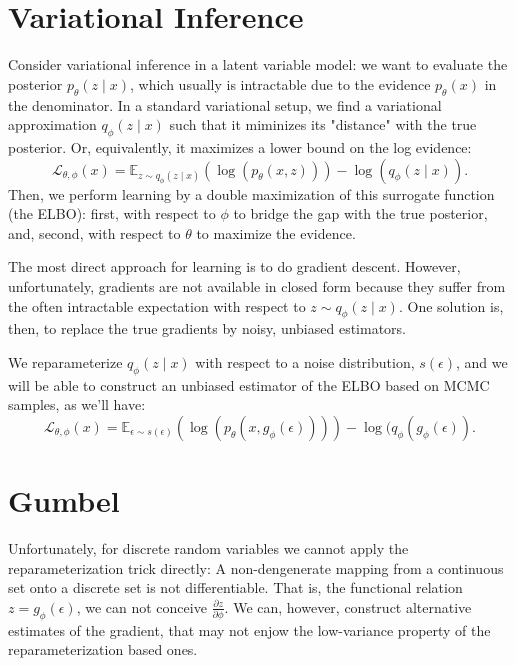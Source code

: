 \documentclass[11pt]{article}
\def\L{\mathcal{L}}
\def\E{\mathbb{E}}
\def\eps{\epsilon}
\begin{document}
\section{Variational Inference}

Consider variational inference in a latent variable model: we want to evaluate the posterior $p_\theta(z \mid x)$, which usually is intractable due to the evidence $p_\theta(x)$ in the denominator. In a standard variational setup, we find a variational approximation $q_\phi(z \mid x)$ such that it miminizes its "distance" with the true posterior. Or, equivalently, it maximizes a lower bound on the log evidence:
\begin{equation}
\L_{\theta,\phi}(x) = \E_{z\sim q_\phi(z\mid x)}(\log(p_\theta(x,z)))-\log(q_\phi(z\mid x)).
\end{equation}
Then, we perform learning by a double maximization of this surrogate function (the ELBO): first, with respect to $\phi$ to bridge the gap with the true posterior, and, second, with respect to $\theta$ to maximize the evidence.

The most direct approach for learning is to do gradient descent. However, unfortunately, gradients are not available in closed form because they suffer from the often intractable expectation with respect to $z\sim q_\phi(z\mid x)$. One solution is, then, to replace the true gradients by noisy, unbiased estimators.

We reparameterize $q_\phi(z\mid x)$ with respect to a noise distribution, $s(\eps)$, and we will be able to construct an unbiased estimator of the ELBO based on MCMC samples, as we'll have:
\begin{equation}
\L_{\theta,\phi}(x) = \E_{\eps\sim s(\eps)}(\log(p_\theta(x,g_\phi(\eps))))-\log(q_\phi(g_\phi(\eps)).
\end{equation}

\section{Gumbel}

Unfortunately, for discrete random variables we cannot apply the reparameterization trick directly: A non-dengenerate mapping from a continuous set onto a discrete set is not differentiable. That is, the functional relation $z = g_\phi(\eps)$, we can not conceive $\frac{\partial z}{\partial \phi}$. We can, however, construct alternative estimates of the gradient, that may not enjow the low-variance property of the reparameterization based ones.
\end{document}
